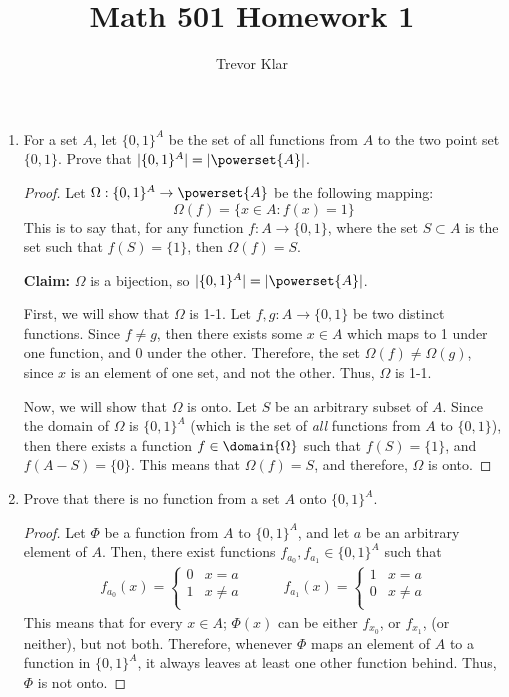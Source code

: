 \documentclass[letterpaper]{article}
\title{Math 501 \linebreak
Homework 1}
\author{Trevor Klar}
\begin{document}
\maketitle

\begin{enumerate}
\item For a set $A$, let $\{0,1\}^A$ be the set of all functions from $A$ to the two point set $\{0,1\}$. Prove that $|\{0,1\}^A|=|\powerset{A}|$.
\begin{proof}
Let $\Omega: \{0,1\}^A \to \powerset{A}$ be the following mapping: $$\Omega(f) = \{x \in A : f(x) = 1\}$$ This is to say that, for any function $f:A \to \{0,1\}$, where the set $S \subset A$  is the set such that $f(S)=\{1\}$, then $\Omega(f) = S$. 

\textbf{Claim:} $\Omega$ is a bijection, so $|\{0,1\}^A|=|\powerset{A}|$.

First, we will show that $\Omega$ is 1-1. Let $f,g:A \to \{0,1\}$ be two distinct functions. Since $f \neq g$, then there exists some $x \in A$ which maps to 1 under one function, and 0 under the other. Therefore, the set $\Omega(f) \neq \Omega(g)$, since $x$ is an element of one set, and not the other. Thus, $\Omega$ is 1-1.

Now, we will show that $\Omega$ is onto. Let $S$ be an arbitrary subset of $A$. Since the domain of $\Omega$ is $\{0,1\}^A$ (which is the set of \emph{all} functions from $A$ to $\{0,1\}$), then there exists a function $f \in \domain{\Omega}$ such that $f(S)=\{1\}$, and $f(A-S)=\{0\}$. This means that $\Omega(f)=S$, and therefore, $\Omega$ is onto.
\end{proof}

\item Prove that there is no function from a set $A$ onto $\{0,1\}^A$. 
\begin{proof}
Let $\Phi$ be a function from $A$ to $\{0,1\}^A$, and let $a$ be an arbitrary element of $A$. Then, there exist functions $f_{a_0},f_{a_1} \in \{0,1\}^A$ such that 
\[
\begin{array}{cc}
{
f_{a_0}(x)=
\begin{cases}
0 & x=a\\
1 & x\neq a \\
\end{cases}
\quad

} & {

\quad
f_{a_1}(x)=
\begin{cases}
1 & x=a\\
0 & x\neq a \\
\end{cases}
}
\end{array}
\]
This means that for every $x \in A$; $\Phi(x)$ can be either $f_{x_0}$, or $f_{x_1}$, (or neither), but not both. Therefore, whenever $\Phi$ maps an element of $A$ to a function in $\{0,1\}^A$, it always leaves at least one other function behind. Thus, $\Phi$ is not onto. 
\end{proof}


\end{enumerate}
\end{document}
